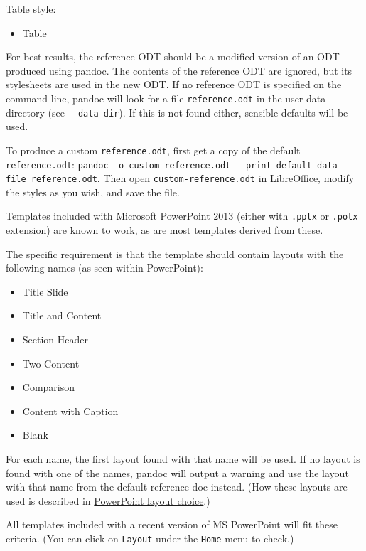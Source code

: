 \documentclass[
  b5paper
]{book}
\providecommand{\tightlist}{%
  \setlength{\itemsep}{0pt}\setlength{\parskip}{0pt}}
\begin{document}
\begin{description}
\begin{description}
Table style:

\begin{itemize}
\tightlist
\item
  Table
\end{itemize}
\item[ODT]
For best results, the reference ODT should be a modified version of an
ODT produced using pandoc. The contents of the reference ODT are
ignored, but its stylesheets are used in the new ODT. If no reference
ODT is specified on the command line, pandoc will look for a file
\texttt{reference.odt} in the user data directory (see
\texttt{-\/-data-dir}). If this is not found either, sensible defaults
will be used.

To produce a custom \texttt{reference.odt}, first get a copy of the
default \texttt{reference.odt}:
\texttt{pandoc\ -o\ custom-reference.odt\ -\/-print-default-data-file\ reference.odt}.
Then open \texttt{custom-reference.odt} in LibreOffice, modify the
styles as you wish, and save the file.
\item[PowerPoint]
Templates included with Microsoft PowerPoint 2013 (either with
\texttt{.pptx} or \texttt{.potx} extension) are known to work, as are
most templates derived from these.

The specific requirement is that the template should contain layouts
with the following names (as seen within PowerPoint):

\begin{itemize}
\tightlist
\item
  Title Slide
\item
  Title and Content
\item
  Section Header
\item
  Two Content
\item
  Comparison
\item
  Content with Caption
\item
  Blank
\end{itemize}

For each name, the first layout found with that name will be used. If no
layout is found with one of the names, pandoc will output a warning and
use the layout with that name from the default reference doc instead.
(How these layouts are used is described in
\hyperref[powerpoint-layout-choice]{PowerPoint layout choice}.)

All templates included with a recent version of MS PowerPoint will fit
these criteria. (You can click on \texttt{Layout} under the
\texttt{Home} menu to check.)


\end{description}
\end{description}
\end{document}
